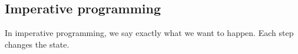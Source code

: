 
\subsection{Imperative programming}

In imperative programming, we say exactly what we want to happen. Each step changes the state.

